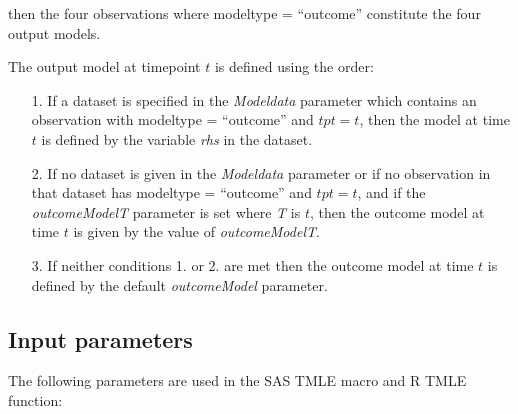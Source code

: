 \documentclass[10pt]{article}
\begin{document}
\begin{itemize}
then the four observations where modeltype = ``outcome'' constitute the four output models.

The output model at timepoint $t$ is defined using the order:
\begin{itemize}
 \item[{1.}] If a dataset is specified in the {\em Modeldata} parameter which contains an observation with modeltype = ``outcome'' and $tpt = t$, then the model at time$t$ is defined by the variable {\em rhs} in the dataset.
 \item[{2.}] If no dataset is given in the {\em Modeldata} parameter or if no observation in that dataset has modeltype = ``outcome'' and $tpt = t$, and if the {\em outcomeModelT} parameter is set where {\em T} is $t$, then the outcome model at time $t$ is given by the value of {\em outcomeModelT}.
 \item[{3.}] If neither conditions {1.} or {2.} are met then the outcome model at time $t$ is defined by the default {\em outcomeModel} parameter.
\end{itemize}
\end{itemize}
\newpage
\subsection*{Input parameters}

The following parameters are used in the SAS TMLE macro and R TMLE function:
\end{document}
